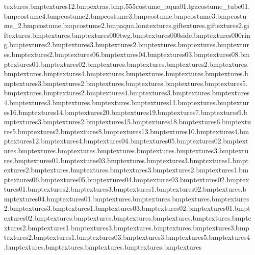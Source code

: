 textures\aquasandcas.bmp textures\orangerock12.bmp extras\map.bmp.555 costume\shades_aqua01.tga costume\mtweety_tube01.bmp costume\tongueline4.bmp costume\bodyeyebrow2.bmp costume\eyetex3.bmp costume\muzzlestubble.bmp costume\bodytoes3.bmp costume_2.bmp costume\noseshine.bmp costume\earslined2.bmp aqua.lom textures\eyes.gif textures\flashlight.gif textures\flashlight2.gif textures\aquabarrel.bmp textures\aquabarrelend.bmp textures\1000twg.bmp textures\1000side.bmp textures\1000ring.bmp textures\beachhuts2.bmp textures\beachhuts3.bmp textures\washupbottle2.bmp textures\washupbottle.bmp textures\aquacontpanel.bmp textures\flash.bmp textures\strings2.bmp textures\anvil06.bmp textures\anvil04.bmp textures\anvil03.bmp textures\anvil08.bmp textures\woodblock01.bmp textures\woodblock02.bmp textures\lighthouselight.bmp textures\alightroof.bmp textures\aquafish2.bmp textures\aquafish.bmp textures\tazwantring.bmp textures\lilo4.bmp textures\aquacereal.bmp textures\aquabeantintop.bmp textures\aquabeantin.bmp textures\liferaftsign.bmp textures\liferaft3.bmp textures\liferaft2.bmp textures\liferaft.bmp textures\washmdrum.bmp textures\washmdrumb.bmp textures\washcase5.bmp textures\washcase.bmp textures\washcase2.bmp textures\washcase4.bmp textures\washcase3.bmp textures\washmglass.bmp textures\sponge4.bmp textures\sponge3.bmp textures\sail.bmp textures\shipcnest.bmp textures\pyrateship11.bmp textures\shiprope.bmp textures\pyrateship16.bmp textures\pyrateship14.bmp textures\pyrateship20.bmp textures\pyrateship19.bmp textures\pyrateship7.bmp textures\pyrateship9.bmp textures\pyrateship3.bmp textures\shiphul2.bmp textures\pyrateship15.bmp textures\pyrateship18.bmp textures\pyrateship6.bmp textures\pyrateship5.bmp textures\pyrateship2.bmp textures\pyrateship8.bmp textures\pyrateship13.bmp textures\pyrateship10.bmp textures\pyrateship4.bmp textures\pyrateship12.bmp textures\clothes4.bmp textures\whackbit04.bmp textures\whackbit05.bmp textures\whackbit02.bmp textures\cutlass.bmp textures\beachball.bmp textures\scroll.bmp textures\geniebottle.bmp textures\banana.bmp textures\clothes3.bmp textures\cereal.bmp textures\whackbit01.bmp textures\whackbit03.bmp textures\eyepatch.bmp textures\blue3.bmp textures\blue1.bmp textures\blue2.bmp textures\necklace.bmp textures\ring.bmp textures\red3.bmp textures\red2.bmp textures\red1.bmp textures\splinter06.bmp textures\splinter05.bmp textures\splinter04.bmp textures\splinter03.bmp textures\splinter02.bmp textures\splinter01.bmp textures\yellow2.bmp textures\yellow3.bmp textures\yellow1.bmp textures\coins02.bmp textures\bakedbean.bmp textures\coins04.bmp textures\diamond01.bmp textures\fishyellow.bmp textures\fish.bmp textures\hook.bmp textures\green2.bmp textures\green3.bmp textures\green1.bmp textures\goldnugget03.bmp textures\goldnugget02.bmp textures\goldnugget01.bmp textures\diamond02.bmp textures\fishgreen.bmp textures\lifebuoy.bmp textures\piratehat.bmp textures\float.bmp textures\pegleg.bmp textures\purple2.bmp textures\purple1.bmp textures\purple3.bmp textures\spade.bmp textures\starfish.bmp textures\white3.bmp textures\white2.bmp textures\white1.bmp textures\feather03.bmp textures\aquaplanks3.bmp textures\aquaplanks5.bmp textures\aquaplanks4.bmp textures\grambox.bmp textures\gramtop.bmp textures\gramshined.bmp textures\gramshine.bmp textures